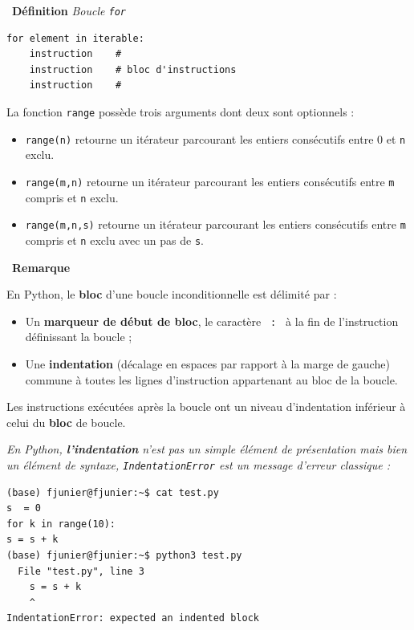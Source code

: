 \documentclass[a4paper, french, 12pt]{article}  %
\newcounter{rque}
\newenvironment{remarque}
{\par \medskip    \addtocounter{rque}{1} \noindent  
\begin{bclogo}[arrondi =0.1,  ombre = true, barre=snake, noborder = true, logo=\bcinfo, marge=0]{~\textbf{Remarque} \textbf{\therque}}  \par }
{
\end{bclogo}
 \par \bigskip }
\newcounter{def}
\newenvironment{definition}[1]
{\par \medskip   \addtocounter{def}{1} \noindent  
\begin{bclogo}[arrondi =0.1,  ombre = true, barre=none, logo=\bcbook, marge=4]{~\textbf{Définition} \textbf{\thedef} {\itshape #1} }  \par}
{
\end{bclogo}
 \par \bigskip }
\begin{document}
\begin{definition}{Boucle \texttt{for}}
\begin{center}
\begin{minipage}{0.9\linewidth}
\begin{lstlisting}
for element in iterable:
    instruction    #
    instruction    # bloc d'instructions
    instruction    #
\end{lstlisting}
\end{minipage}
\end{center}
 
 La fonction \lstinline{range} possède trois arguments dont deux sont optionnels :
 
 \begin{itemize}
\item \texttt{range(n)} retourne un itérateur parcourant les entiers consécutifs entre 0 et \texttt{n} exclu.
\item \texttt{range(m,n)} retourne un itérateur parcourant les entiers consécutifs entre \texttt{m} compris  et \texttt{n} exclu.
\item \texttt{range(m,n,s)} retourne un itérateur parcourant les entiers consécutifs entre \texttt{m} compris  et \texttt{n} exclu avec un pas  de \texttt{s}.
\end{itemize}

\end{definition}


\begin{remarque}{}

En Python, le \textbf{bloc} d'une boucle inconditionnelle est délimité par :


\begin{itemize}
	\item Un \textbf{marqueur de début de bloc}, le caractère   \texttt{ : } à la fin de l'instruction définissant la boucle ;
	\item Une \textbf{indentation}  (décalage en espaces par rapport à la marge de gauche) commune à toutes les lignes d'instruction appartenant au bloc de la boucle.
\end{itemize}

Les instructions exécutées après la boucle ont un niveau d'indentation inférieur à celui du \textbf{bloc} de boucle.

\medskip

{\itshape 
En Python, \textbf{l'indentation} n'est pas un simple élément de présentation mais bien un élément de syntaxe, \texttt{IndentationError} est un message d'erreur classique   : }

\begin{lstlisting}[style=compil]
(base) fjunier@fjunier:~$ cat test.py
s  = 0
for k in range(10):
s = s + k
(base) fjunier@fjunier:~$ python3 test.py
  File "test.py", line 3
    s = s + k
    ^
IndentationError: expected an indented block
\end{lstlisting}

\end{remarque}
\end{document}

